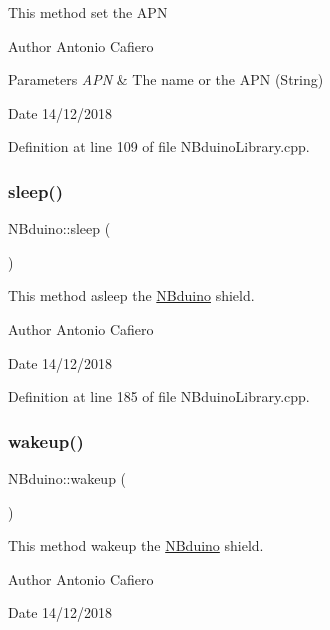 This method set the A\+PN \begin{DoxyAuthor}{Author}
Antonio Cafiero 
\end{DoxyAuthor}

\begin{DoxyParams}{Parameters}
{\em A\+PN} & The name or the A\+PN (String) \\
\hline
\end{DoxyParams}
\begin{DoxyDate}{Date}
14/12/2018 
\end{DoxyDate}


Definition at line 109 of file N\+Bduino\+Library.\+cpp.

\mbox{\label{class_n_bduino_ac7bf8f7f0552ad2cbda4b3e91a82bfca}} 
\subsubsection{\texorpdfstring{sleep()}{sleep()}}
{\footnotesize\ttfamily N\+Bduino\+::sleep (\begin{DoxyParamCaption}{ }\end{DoxyParamCaption})}

This method asleep the \mbox{\hyperlink{class_n_bduino}{N\+Bduino}} shield. \begin{DoxyAuthor}{Author}
Antonio Cafiero 
\end{DoxyAuthor}
\begin{DoxyDate}{Date}
14/12/2018 
\end{DoxyDate}


Definition at line 185 of file N\+Bduino\+Library.\+cpp.

\mbox{\label{class_n_bduino_a8e740e7b90e6e75b7dd3b7900ee0dd22}} 
\subsubsection{\texorpdfstring{wakeup()}{wakeup()}}
{\footnotesize\ttfamily N\+Bduino\+::wakeup (\begin{DoxyParamCaption}{ }\end{DoxyParamCaption})}

This method wakeup the \mbox{\hyperlink{class_n_bduino}{N\+Bduino}} shield. \begin{DoxyAuthor}{Author}
Antonio Cafiero 
\end{DoxyAuthor}
\begin{DoxyDate}{Date}
14/12/2018 
\end{DoxyDate}



